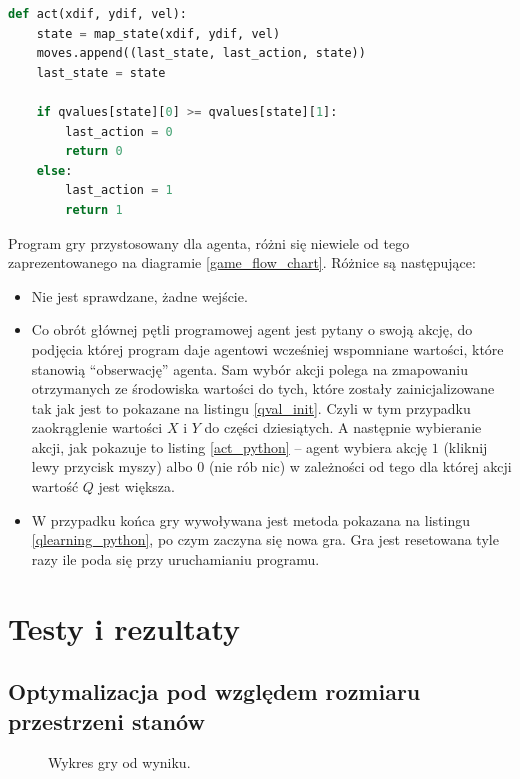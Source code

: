 \documentclass[a4paper, 12pt,oneside]{book}
\begin{document}
\begin{lstlisting}[language=Python, label={act_python},
caption={Metoda wybierająca akcję agenta.}, captionpos=t]
def act(xdif, ydif, vel):
    state = map_state(xdif, ydif, vel)
    moves.append((last_state, last_action, state))
    last_state = state

    if qvalues[state][0] >= qvalues[state][1]:
        last_action = 0
        return 0
    else:
        last_action = 1
        return 1
\end{lstlisting}
Program gry przystosowany dla agenta, różni się niewiele od tego
zaprezentowanego na diagramie \ref{game_flow_chart}. Różnice są następujące:
\begin{itemize}
\setlength\itemsep{-0.4em}
\item Nie jest sprawdzane, żadne wejście.
\item Co obrót głównej pętli programowej agent jest pytany o swoją akcję, do
	podjęcia której program daje agentowi wcześniej wspomniane wartości,
	które stanowią ``obserwację'' agenta. Sam wybór akcji polega na
	zmapowaniu otrzymanych ze środowiska wartości do tych, które zostały
	zainicjalizowane tak jak jest to pokazane na listingu \ref{qval_init}.
	Czyli w tym przypadku zaokrąglenie wartości $X$ i $Y$ do części
	dziesiątych. A następnie wybieranie akcji, jak pokazuje to
	listing \ref{act_python} -- agent wybiera akcję $1$ (kliknij lewy
	przycisk myszy) albo $0$ (nie rób nic) w zależności od tego dla której
	akcji wartość $Q$ jest większa.
\item W przypadku końca gry wywoływana jest metoda pokazana na listingu
	\ref{qlearning_python},  po czym zaczyna się nowa gra. Gra jest
	resetowana tyle razy ile poda się przy uruchamianiu programu.
\end{itemize}

\chapter{Testy i rezultaty}
\label{chapter:testy}
\section{Optymalizacja pod względem rozmiaru przestrzeni stanów}
\begin{figure}[!htb]
	\begin{center}
		
	\end{center}
	\caption{Wykres gry od wyniku.}
	\label{plot_first_approach}
\end{figure}
\end{document}
